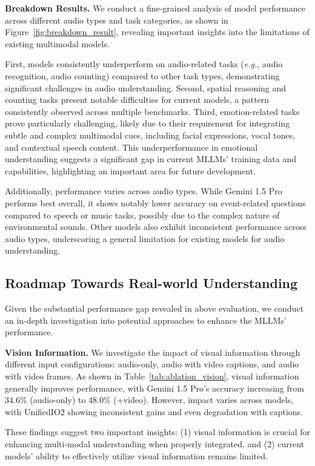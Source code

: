 \textbf{Breakdown Results.} We conduct a fine-grained analysis of model performance across different audio types and task categories, as shown in Figure~\ref{fig:breakdown_result}, revealing important insights into the limitations of existing multimodal models.

First, models consistently underperform on audio-related tasks ({\em e.g.}, audio recognition, audio counting) compared to other task types, demonstrating significant challenges in audio understanding. Second, spatial reasoning and counting tasks present notable difficulties for current models, a pattern consistently observed across multiple benchmarks. Third, emotion-related tasks prove particularly challenging, likely due to their requirement for integrating subtle and complex multimodal cues, including facial expressions, vocal tones, and contextual speech content. This underperformance in emotional understanding suggests a significant gap in current MLLMs' training data and capabilities, highlighting an important area for future development.

Additionally, performance varies across audio types. While Gemini 1.5 Pro performs best overall, it shows notably lower accuracy on event-related questions compared to speech or music tasks, possibly due to the complex nature of environmental sounds. Other models also exhibit inconsistent performance across audio types, underscoring a general limitation for existing models for audio understanding.


\subsection{Roadmap Towards Real-world Understanding}
Given the substantial performance gap revealed in above evaluation, 
we conduct an in-depth investigation into potential approaches to enhance the MLLMs' performance.

\textbf{Vision Information.} 
We investigate the impact of visual information through different input configurations: audio-only, audio with video captions, and audio with video frames. As shown in Table~\ref{tab:ablation_vision}, visual information generally improves performance, with Gemini 1.5 Pro's accuracy increasing from $34.6\%$ (audio-only) to $48.0\%$ (+video). However, impact varies across models, with UnifiedIO2 showing inconsistent gains and even degradation with captions. 

These findings suggest two important insights: (1) visual information is crucial for enhancing multi-modal understanding when properly integrated, and (2) current models' ability to effectively utilize visual information remains limited. 

